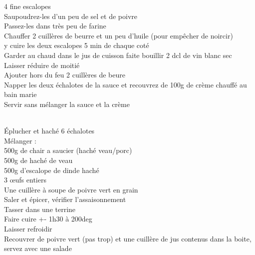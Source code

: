 \begin{minipage}[c]{\textwidth}
4 fine escalopes\\
Saupoudrez-les d'un peu de sel et de poivre\\
Passez-les dans très peu de farine\\
Chauffer 2 cuillères de beurre et un peu d'huile (pour empêcher de noircir)\\
y cuire les deux escalopes 5 min de chaque coté\\
Garder au chaud dans le jus de cuisson faite bouillir 2 dcl de vin blanc sec\\
Laisser réduire de moitié\\
Ajouter hors du feu 2 cuillères de beure\\
Napper les deux échalotes de la sauce et recouvrez de 100g de crème chauffé au bain marie\\
Servir sans mélanger la sauce et la crème\\
\\

\end{minipage}

\begin{minipage}[c]{\textwidth}
Éplucher et haché 6 échalotes\\
Mélanger :\\
    500g de chair a saucier (haché veau/porc)\\
    500g de haché de veau\\
    500g d'escalope de dinde haché\\
    3 œufs entiers\\
    Une cuillère à soupe de poivre vert en grain\\
Saler et épicer, vérifier l'assaisonnement\\
Tasser dans une terrine\\
Faire cuire +- 1h30 à 200deg\\
Laisser refroidir\\
Recouvrer de poivre vert (pas trop) et une cuillère de jus contenus dans la boite, servez avec une salade \\
\\

\end{minipage}

